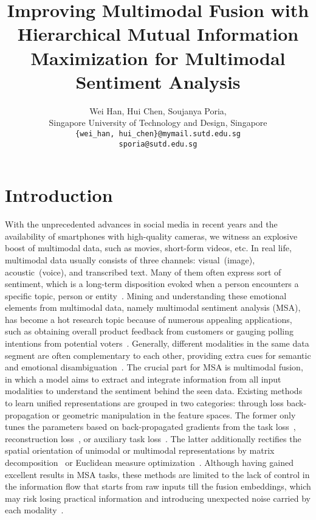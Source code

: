 \documentclass[11pt]{article}
\title{Improving Multimodal Fusion with Hierarchical Mutual Information Maximization for Multimodal Sentiment Analysis}
\author{Wei Han, Hui Chen, Soujanya Poria,\\
   Singapore University of Technology and Design, Singapore\\
  \texttt{\{wei\_han, hui\_chen\}@mymail.sutd.edu.sg}\\
  \texttt{sporia@sutd.edu.sg}\\
  }
\newcommand{\mv}{visual}
\newcommand{\ma}{acoustic}
\begin{document}
\maketitle



\section{Introduction}
With the unprecedented advances in social media in recent years and the availability of smartphones with high-quality cameras, we witness an explosive boost of multimodal data, such as movies, short-form videos, etc.
In real life, multimodal data usually consists of three channels: \mv~(image), \ma~(voice), and transcribed text. 
Many of them often express sort of sentiment, which is a long-term disposition evoked when a person encounters a specific topic, person or entity~\citep{deonna2012emotions,poria2020beneath}.
Mining and understanding these emotional elements from multimodal data, namely multimodal sentiment analysis (MSA), has become a hot research topic because of numerous appealing applications, such as obtaining overall product feedback from customers or gauging polling intentions from potential voters~\citep{melville2009sentiment}. 
Generally, different modalities in the same data segment are often complementary to each other, providing extra cues for semantic and emotional disambiguation~\citep{ngiam2011multimodal}. 
The crucial part for MSA is multimodal fusion, in which a model aims to extract and integrate information from all input modalities to understand the sentiment behind the seen data.
Existing methods to learn unified representations are grouped
in two categories: through loss back-propagation or geometric manipulation in the feature spaces.
The former only tunes the parameters based on back-propagated gradients from the task loss~\citep{zadeh2017tensor, tsai2019multimodal, ghosal-etal-2019-dialoguegcn}, reconstruction loss~\citep{mai2020modality}, or auxiliary task loss~\citep{chen2017multimodal,yu2021learning}.
The latter additionally rectifies the spatial orientation of unimodal or multimodal representations by matrix decomposition~\citep{liu2018efficient} or Euclidean measure optimization~\citep{sun2020learning, hazarika2020misa}.
Although having gained excellent results in MSA tasks, these methods are limited to the lack of control in the information flow 
that starts from raw inputs till the fusion embeddings, which may risk losing practical information and introducing unexpected noise carried by each modality~\cite{tsai2020multimodal}. 
\end{document}

